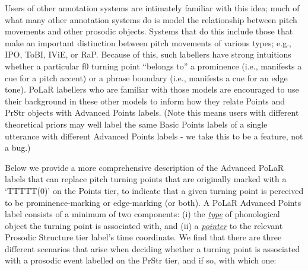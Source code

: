 \documentclass[11pt, twoside]{memoir}
\begin{document}
Users of other annotation systems are intimately familiar with this idea; much of what many other annotation systems do is model the relationship between pitch movements and other prosodic objects. Systems that do this include those that make an important distinction between pitch movements of various types; e.g., IPO, ToBI, IViE, or RaP. Because of this, such labellers have strong intuitions whether a particular f0 turning point “belongs to” a prominence (i.e., manifests a cue for a pitch accent) or a phrase boundary (i.e., manifests a cue for an edge tone). PoLaR labellers who are familiar with those models are encouraged to use their background in these other models to inform how they relate Points and PrStr objects with Advanced Points labels. (Note this means users with different theoretical priors may well label the same Basic Points labels of a single utterance with different Advanced Points labels - we take this to be a feature, not a bug.)

Below we provide a more comprehensive description of the Advanced PoLaR labels that can replace pitch turning points that are originally marked with a ‘TTTTT(0)’ on the Points tier, to indicate that a given turning point is perceived to be prominence-marking or edge-marking (or both). A PoLaR Advanced Points label consists of a minimum of two components: (i) the \textit{\uline{type}} of phonological object the turning point is associated with, and (ii) a \textit{\uline{pointer}} to the relevant Prosodic Structure tier label’s time coordinate. We find that there are three different scenarios that arise when deciding whether a turning point is associated with a prosodic event labelled on the PrStr tier, and if so, with which one:
\end{document}
